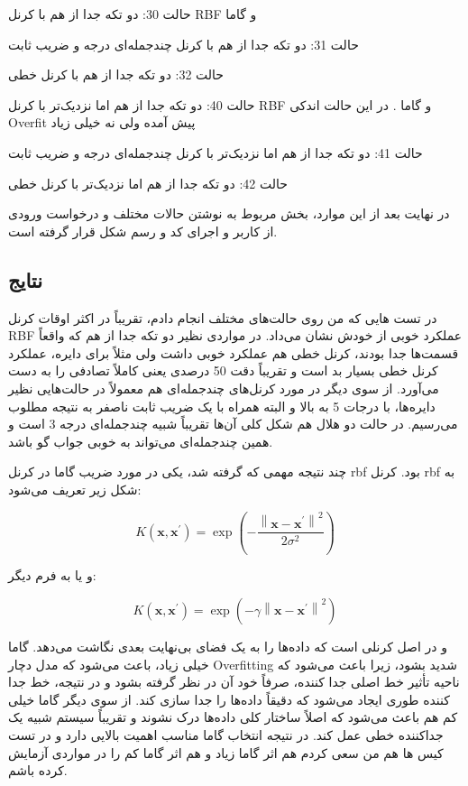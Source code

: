 \documentclass[12pt,titlepage,a4page , tikz , multi,table , svgnames,xcdraw]{article}
\begin{document}
حالت 30: دو تکه جدا از هم با کرنل RBF و گاما 


حالت 31: دو تکه جدا از هم با کرنل چندجمله‌ای درجه  و ضریب ثابت 

حالت 32: دو تکه جدا از هم با کرنل خطی

حالت 40: دو تکه جدا از هم اما نزدیک‌تر با کرنل RBF و گاما . در این حالت اندکی Overfit پیش آمده ولی نه خیلی زیاد


حالت 41: دو تکه جدا از هم اما نزدیک‌تر  با کرنل چندجمله‌ای درجه  و ضریب ثابت 

حالت 42: دو تکه جدا از هم اما نزدیک‌تر با کرنل خطی


در نهایت بعد از این موارد، بخش مربوط به نوشتن حالات مختلف و درخواست ورودی از کاربر و اجرای کد و رسم شکل قرار گرفته است.

\subsection{نتایج}

در تست هایی که من روی حالت‌های مختلف انجام دادم، تقریباً در اکثر اوقات کرنل RBF عملکرد خوبی از خودش نشان می‌داد. در مواردی نظیر دو تکه جدا از هم که واقعاً قسمت‌ها جدا بودند، کرنل خطی هم عملکرد خوبی داشت ولی مثلاً برای دایره، عملکرد کرنل خطی بسیار بد است و تقریباً دقت 50 درصدی یعنی کاملاً تصادفی را به دست می‌آورد. از سوی دیگر در مورد کرنل‌های چندجمله‌ای هم معمولاً در حالت‌هایی نظیر دایره‌ها، با درجات 5 به بالا و البته همراه با یک ضریب ثابت ناصفر به نتیجه مطلوب می‌رسیم. در حالت دو هلال هم شکل کلی آن‌ها تقریباً شبیه چندجمله‌ای درجه 3 است و همین چندجمله‌ای می‌تواند به خوبی جواب گو باشد.

چند نتیجه مهمی که گرفته شد، یکی در مورد ضریب گاما در کرنل rbf بود. کرنل rbf به شکل زیر تعریف می‌شود:

$$K\left(\mathbf{x}, \mathbf{x}^{\prime}\right)=\exp \left(-\frac{\left\|\mathbf{x}-\mathbf{x}^{\prime}\right\|^{2}}{2 \sigma^{2}}\right)$$

و یا به فرم دیگر:

$$K\left(\mathbf{x}, \mathbf{x}^{\prime}\right)=\exp \left(-\gamma\left\|\mathbf{x}-\mathbf{x}^{\prime}\right\|^{2}\right)$$

و در اصل کرنلی است که داده‌ها را به یک فضای بی‌نهایت بعدی نگاشت می‌دهد. گاما خیلی زیاد، باعث می‌شود که مدل دچار Overfitting شدید بشود، زیرا باعث می‌شود که ناحیه تأثیر خط اصلی جدا کننده، صرفاً خود آن در نظر گرفته بشود و در نتیجه، خط جدا کننده طوری ایجاد می‌شود که دقیقاً داده‌ها را جدا سازی کند. از سوی دیگر گاما خیلی کم هم باعث می‌شود که اصلاً ساختار کلی داده‌ها درک نشوند و تقریباً سیستم شبیه یک جداکننده خطی عمل کند. در نتیجه انتخاب گاما مناسب اهمیت بالایی دارد و در تست کیس ها هم من سعی کردم هم اثر گاما زیاد و هم اثر گاما کم را در مواردی آزمایش کرده باشم.
\end{document}
